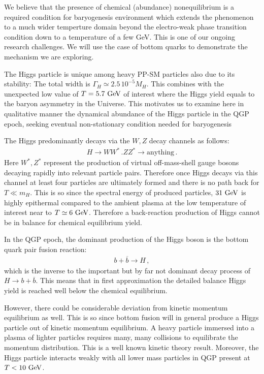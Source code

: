 We believe that the presence of chemical (abundance) nonequilibrium is a required condition for baryogenesis environment which extends the phenomenon to a much wider temperture domain beyond the electro-weak phase transition condition down to a temperature of a few GeV. This is one of our ongoing research challenges. We will use the case of bottom quarks to demonstrate the mechanism we are exploring.
 
The Higgs particle is unique among heavy PP-SM particles also due to its stability: The total width is $\Gamma_H\simeq 2.5\,10^{-5}M_H$. This combines with the unexpected low value of $T=5.7\text{ GeV}$ of interest where the Higgs yield equals to the baryon asymmetry in the Universe. This motivates us to examine here in qualitative manner the dynamical abundance of the Higgs particle in the QGP epoch, seeking eventual non-stationary condition needed for baryogenesis 

The Higgs predominantly decays via the $W,Z$ decay channels as follows:
\begin{align}
H\longrightarrow WW^\ast\,. ZZ^\ast\longrightarrow\mathrm{anything}\,.
\end{align}
Here $W^\ast,Z^\ast$ represent the production of virtual off-mass-shell gauge bosons decaying rapidly into relevant particle pairs. Therefore once Higgs decays via this channel at least four particles are ultimately formed and there is no path back for $T\ll m_H$. This is so since the spectral energy of produced particles, $31\text{ GeV}$ is highly epithermal compared to the ambient plasma at the low temperature of interest near to $T\simeq 6\text{ GeV}$. Therefore a back-reaction production of Higgs cannot be in balance for chemical equilibrium yield. 

In the QGP epoch, the dominant production of the Higgs boson is the bottom quark pair fusion reaction: 
\begin{align}
b+\overline{b}\longrightarrow H\,,
\end{align}
which is the inverse to the important but by far not dominant decay process of $H\to b+\overline{b}$. This means that in first approximation the detailed balance Higgs yield is reached well below the chemical equilibrium.

However, there could be considerable deviation from kinetic momentum equilibrium as well. This is so since bottom fusion will in general produce a Higgs particle out of kinetic momentum equilibrium. A heavy particle immersed into a plasma of lighter particles requires many, many collisions to equilibrate the momentum distribution. This is a well known kinetic theory result. Moreover, the Higgs particle interacts weakly with all lower mass particles in QGP present at $T<10\text{ GeV}$. 

